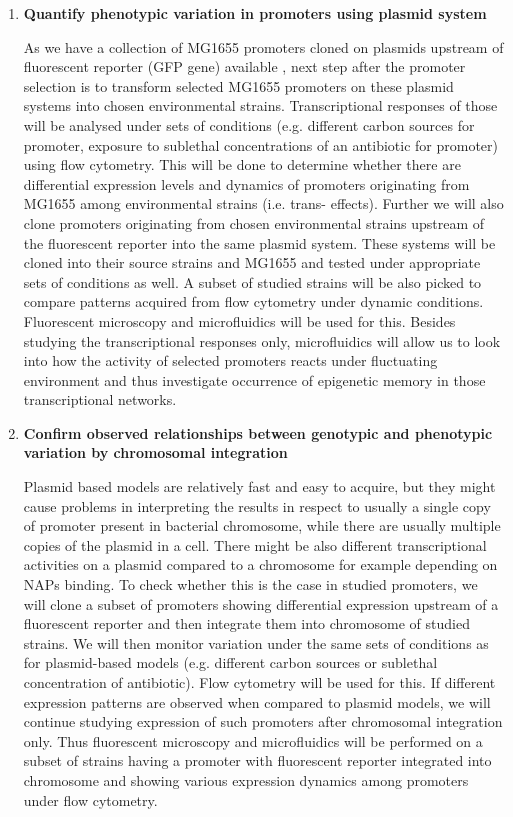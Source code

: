 \begin{enumerate}[font=\bfseries]
\begin{enumerate}[font=\bfseries]
		\item \textbf{Quantify phenotypic variation in promoters using plasmid system}
		
		As we have a collection of MG1655 promoters cloned on plasmids upstream of fluorescent reporter (GFP gene) available \cite{zaslaver2006comprehensive}, next step after the promoter selection is to transform selected MG1655 promoters on these plasmid systems into chosen environmental  strains.
		Transcriptional responses of those will be analysed under sets of conditions (e.g. different carbon sources for  promoter, exposure to sublethal concentrations of an antibiotic for  promoter) using flow cytometry.
		This will be done to determine whether there are differential expression levels and dynamics of promoters originating from MG1655 among environmental strains (i.e. trans- effects).
		Further we will also clone promoters originating from chosen environmental strains upstream of the fluorescent reporter into the same plasmid system.
		These  systems will be cloned into their source strains and MG1655 and tested under appropriate sets of conditions as well.
		A subset of studied strains will be also picked to compare patterns acquired from flow cytometry under dynamic conditions.
		Fluorescent microscopy and microfluidics will be used for this.
		Besides studying the transcriptional responses only, microfluidics will allow us to look into how the activity of selected promoters reacts under fluctuating environment and thus investigate occurrence of epigenetic memory in those transcriptional networks.
		
		\item \textbf{Confirm observed relationships between genotypic and phenotypic variation by chromosomal integration}
		
		Plasmid based models are relatively fast and easy to acquire, but they might cause problems in interpreting the results in respect to usually a single copy of promoter present in bacterial chromosome, while there are usually multiple copies of the plasmid in a cell.
		There might be also different transcriptional activities on a plasmid compared to a chromosome for example depending on NAPs binding.
		To check whether this is the case in studied promoters, we will clone a subset of promoters showing differential expression upstream of a fluorescent reporter and then integrate them into chromosome of studied strains.
		We will then monitor variation under the same sets of conditions as for plasmid-based models (e.g. different carbon sources or sublethal concentration of antibiotic).
		Flow cytometry will be used for this.
		If different expression patterns are observed when compared to plasmid models, we will continue studying expression of such promoters after chromosomal integration only.
		Thus fluorescent microscopy and microfluidics will be performed on a subset of strains having a promoter with fluorescent reporter integrated into chromosome and showing various expression dynamics among promoters under flow cytometry.


\end{enumerate}
\end{enumerate}
